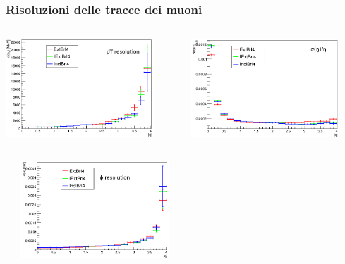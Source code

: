 \documentclass{beamer}
\begin{document}
\begin{frame}
\frametitle{Risoluzioni delle tracce dei muoni}
\begin{columns}
\begin{column}{0.5\textwidth}
\centering
\includegraphics[width=\textwidth,height=3.7cm]{sigPt}
\end{column}
\begin{column}{0.5\textwidth}
\centering
\includegraphics[width=\textwidth,height=3.7cm]{sigEta}
\end{column}
\end{columns}
\vskip-0.5cm
\begin{center}
\centering
\includegraphics[width=0.5\textwidth,height=3.7cm]{sigPhi}
\end{center}

\end{frame}

\end{document}
